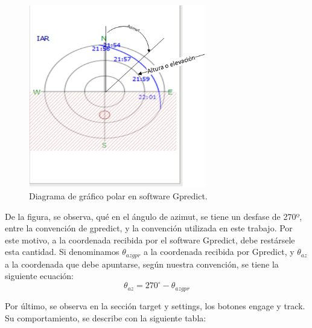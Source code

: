\begin{figure}[ht]
	\centering
	\includegraphics[height=8cm]{polar_plot}
	\caption{Diagrama de gráfico polar en software Gpredict.} 
	\label{fig:polar_plot_expl}
\end{figure}

De la figura, se observa, qué en el ángulo de azimut, se tiene un desfase de 270º, entre la convención de gpredict, y la convención utilizada en este trabajo. Por este motivo, a la coordenada recibida por el software Gpredict, debe restársele esta cantidad. Si denominamos $\theta_{azgpr}$ a la coordenada recibida por Gpredict, y $\theta_{az}$ a la coordenada que debe apuntarse, según nuestra convención, se tiene la siguiente ecuación:
\begin{equation}
	\theta_{az} =270^\circ - \theta_{azgpr}
\end{equation}

Por último, se observa en la sección target y settings, los botones engage y track. Su comportamiento, se describe con la siguiente tabla: 

